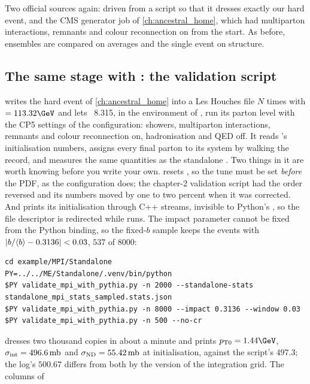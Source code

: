 Two official sources again: \PYTHIA driven from a script so that it dresses
exactly our hard event, and the CMS generator job of \cref{ch:ancestral_home},
which had multiparton interactions, remnants and colour reconnection on
from the start. As before, ensembles are compared on averages and the
single \CMSSW event on structure.

\subsection{The same stage with \PYTHIA: the validation script}
\label{sec:uninvited_cousins:pythia}

 writes the hard event of
\cref{ch:ancestral_home} into a Les Houches file $N$ times with
 $=113.32\GeV$ and lets \PYTHIA~8.315, in the environment of
, run its parton level with the CP5 settings of
the \CMSSW configuration: showers, multiparton interactions, remnants and
colour reconnection on, hadronisation and QED off. It reads \PYTHIA's
initialisation numbers, assigns every final parton to its system by walking
the record, and measures the same quantities as the standalone
. Two things in it are worth knowing before you write your
own.  resets , so the tune must be set
\emph{before} the PDF, as the \CMSSW configuration does; the chapter-2
validation script had the order reversed and its \PYTHIA numbers moved by
one to two percent when it was corrected. And \PYTHIA prints its
initialisation through C++ streams, invisible to Python's ,
so the file descriptor is redirected while  runs. The impact
parameter cannot be fixed from the Python binding, so the fixed-$b$ sample
keeps the events with $|b/\langle b\rangle-0.3136|<0.03$, $537$ of $8000$:
\begin{verbatim}
cd example/MPI/Standalone
PY=../../ME/Standalone/.venv/bin/python
$PY validate_mpi_with_pythia.py -n 2000 --standalone-stats standalone_mpi_stats_sampled.stats.json
$PY validate_mpi_with_pythia.py -n 8000 --impact 0.3136 --window 0.03
$PY validate_mpi_with_pythia.py -n 500 --no-cr
\end{verbatim}
\PYTHIA dresses two thousand copies in about a minute and prints
$\ptzero=1.44\GeV$, $\sigma_{\mathrm{int}}=496.6\,\mathrm{mb}$ and $\sigma_{\mathrm{ND}}=55.42\,\mathrm{mb}$
at initialisation, against the script's $497.3$; the \CMSSW log's $500.67$
differs from both by the version of the integration grid. The columns of
